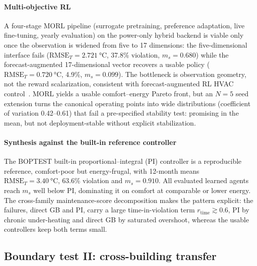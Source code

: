 \documentclass{ieeeaccess}
\newcommand{\RMSE}{\ensuremath{\mathrm{RMSE}}}
\newcommand{\ms}{\ensuremath{m_s}}
\begin{document}
\paragraph{Multi-objective RL}
A four-stage MORL pipeline (surrogate pretraining, preference adaptation, live fine-tuning, yearly
evaluation) on the power-only hybrid backend is viable only once the observation is widened from
five to 17 dimensions: the five-dimensional interface fails
($\RMSE_T=\SI{2.721}{\celsius}$, 37.8\% violation, $\ms=0.680$) while the forecast-augmented
17-dimensional vector recovers a usable policy ($\RMSE_T=\SI{0.720}{\celsius}$, 4.9\%,
$\ms=0.099$). The bottleneck is observation geometry, not the reward scalarization, consistent with
forecast-augmented RL HVAC control~\cite{Gao2024Predictive}. MORL yields a usable comfort--energy
Pareto front, but an $N=5$ seed extension turns the canonical operating points into wide
distributions (coefficient of variation 0.42--0.61) that fail a pre-specified stability test:
promising in the mean, but not deployment-stable without explicit stabilization.

\paragraph{Synthesis against the built-in reference controller}
The BOPTEST built-in proportional--integral (PI) controller is a reproducible reference, comfort-poor but energy-frugal, with
12-month means $\RMSE_T=\SI{3.40}{\celsius}$, 63.6\% violation and $\ms=0.910$. All evaluated
learned agents reach \ms{} well below PI, dominating it on comfort at comparable or lower energy.
The cross-family maintenance-score decomposition makes the pattern explicit: the failures, direct GB
and PI, carry a large time-in-violation term $r_{\mathrm{time}}\gtrsim0.6$, PI by chronic
under-heating and direct GB by saturated overshoot, whereas the usable controllers keep both terms
small.

\subsection{Boundary test II: cross-building transfer}\label{sec:transfer}
\end{document}
